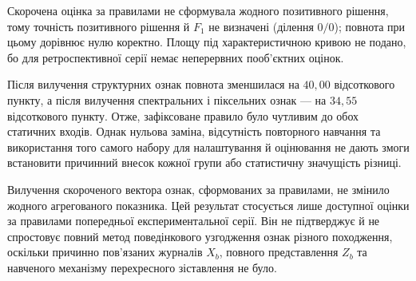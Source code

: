 \begin{table}[htbp]
\caption{Агреговані результати окремих каналів і компонентного вилучення}
\label{tab:ch4_component_results}
\centering
\scriptsize
{}

\vspace{2pt}
\parbox{0.96\textwidth}{\footnotesize * Скорочена оцінка за правилами не сформувала жодного позитивного рішення, тому точність позитивного рішення й $F_1$ не визначені (ділення $0/0$); повнота при цьому дорівнює нулю коректно. Площу під характеристичною кривою не подано, бо для ретроспективної серії немає неперервних пооб’єктних оцінок.}
\end{table}

Після вилучення структурних ознак повнота зменшилася на $40{,}00$ відсоткового пункту, а після вилучення спектральних і піксельних ознак --- на $34{,}55$ відсоткового пункту. Отже, зафіксоване правило було чутливим до обох статичних входів. Однак нульова заміна, відсутність повторного навчання та використання того самого набору для налаштування й оцінювання не дають змоги встановити причинний внесок кожної групи або статистичну значущість різниці.

Вилучення скороченого вектора ознак, сформованих за правилами, не змінило жодного агрегованого показника. Цей результат стосується лише доступної оцінки за правилами попередньої експериментальної серії. Він не підтверджує й не спростовує повний метод поведінкового узгодження ознак різного походження, оскільки причинно пов’язаних журналів $X_b$, повного представлення $Z_b$ та навченого механізму перехресного зіставлення не було.

